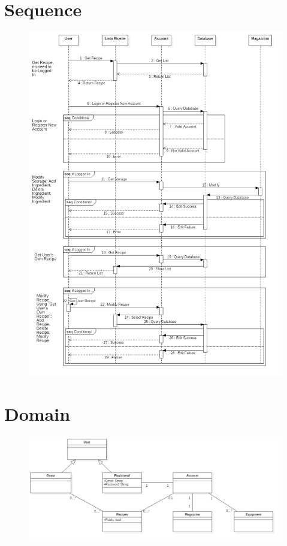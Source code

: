 \documentclass[12pt]{article}
\begin{document}
\section{Sequence}
\begin{figure}[H]
\includegraphics[scale=0.5]{SequenceDiagram1.png}
\centering
\end{figure}
\section{Domain}

\begin{figure}[H]
\includegraphics[width=1.25\textwidth, left]{DomainDiagram.jpg}
\end{figure}
\end{document}
